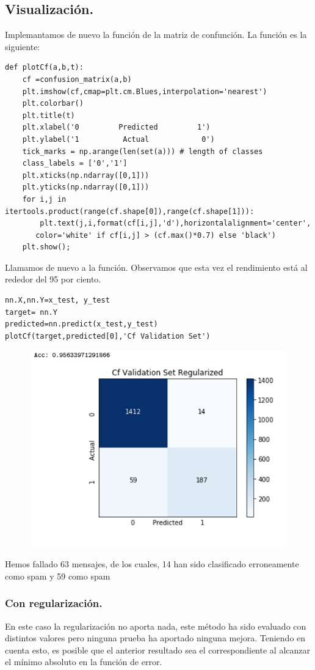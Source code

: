 \documentclass[a4paper,10pt]{article}
\begin{document}
\subsection{Visualización.}
Implemantamos de nuevo la función de la matriz de confunción. La función es la siguiente:
\begin{lstlisting}
def plotCf(a,b,t):
    cf =confusion_matrix(a,b)
    plt.imshow(cf,cmap=plt.cm.Blues,interpolation='nearest')
    plt.colorbar()
    plt.title(t)
    plt.xlabel('0         Predicted         1')
    plt.ylabel('1          Actual            0')
    tick_marks = np.arange(len(set(a))) # length of classes
    class_labels = ['0','1']
    plt.xticks(np.ndarray([0,1]))
    plt.yticks(np.ndarray([0,1]))
    for i,j in itertools.product(range(cf.shape[0]),range(cf.shape[1])):
        plt.text(j,i,format(cf[i,j],'d'),horizontalalignment='center',    
	   color='white' if cf[i,j] > (cf.max()*0.7) else 'black')
    plt.show();
\end{lstlisting}
Llamamos de nuevo a la función. Observamos que esta vez el rendimiento está al rededor del 95 por ciento.
\begin{lstlisting}
nn.X,nn.Y=x_test, y_test 
target= nn.Y
predicted=nn.predict(x_test,y_test) 
plotCf(target,predicted[0],'Cf Validation Set')
\end{lstlisting}
\begin{figure}[H]
\centering
\includegraphics[width=12.0cm, height=8.5cm]{Annotation 2020-03-23 161410}
\end{figure}
Hemos fallado 63 mensajes, de los cuales, 14 han sido clasificado erroneamente como spam y 59 como spam
\subsubsection{Con regularización.}
En este caso la regularización no aporta nada, este método ha sido evaluado con distintos valores pero ninguna prueba ha aportado ninguna mejora. Teniendo en cuenta esto, es posible que el anterior resultado sea el correspondiente al alcanzar el mínimo absoluto en la función de error.
\end{document}
